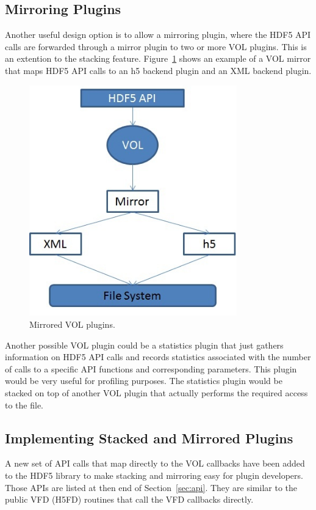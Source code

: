 \subsection{Mirroring Plugins}
Another useful design option is to allow a mirroring plugin, where the
HDF5 API calls are forwarded through a mirror plugin to two or more
VOL plugins. This is an extention to the stacking
feature. Figure~\ref{mirror} shows an example of a VOL mirror that
maps HDF5 API calls to an h5 backend plugin and an XML backend plugin.

\begin{figure}[ht!]
\centering
\includegraphics[width=90mm]{mirrored.jpg}
\caption{Mirrored VOL plugins.}
\label{mirror}
\end{figure}

Another possible VOL plugin could be a statistics plugin that just
gathers information on HDF5 API calls and records statistics
associated with the number of calls to a specific API functions and
corresponding parameters. This plugin would be very useful for
profiling purposes. The statistics plugin would be stacked on top of
another VOL plugin that actually performs the required access to the
file.

\subsection{Implementing Stacked and Mirrored Plugins}
A new set of API calls that map directly to the VOL callbacks have
been added to the HDF5 library to make stacking and mirroring easy for
plugin developers. Those APIs are listed at then end of Section~\ref{sec:api}. They are similar to the public VFD (H5FD) routines that call the VFD callbacks directly.

